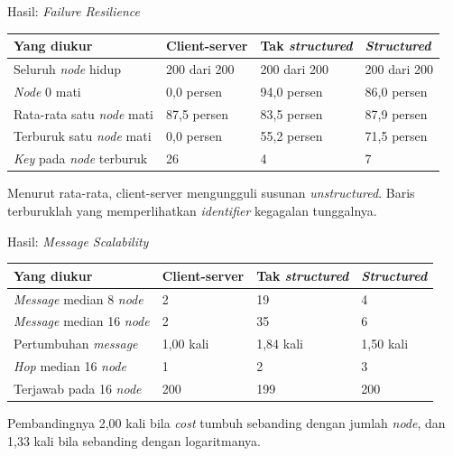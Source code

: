 \documentclass[aspectratio=169, table, 12pt]{beamer}
\begin{document}
\begin{frame}{{\Large Hasil: \textit{Failure Resilience}}}
  \vspace{6pt}
  \centering
  \small
  \begin{tabularx}{0.95\textwidth}{|X|l|l|l|}
    \hline
    \textbf{Yang diukur} & \textbf{Client-server} & \textbf{Tak \textit{structured}} & \textbf{\textit{Structured}} \\
    \hline
    Seluruh \textit{node} hidup & 200 dari 200 & 200 dari 200 & 200 dari 200 \\
    \hline
    \textit{Node} 0 mati & 0,0 persen & 94,0 persen & 86,0 persen \\
    \hline
    Rata-rata satu \textit{node} mati & 87,5 persen & 83,5 persen & 87,9 persen \\
    \hline
    Terburuk satu \textit{node} mati & 0,0 persen & 55,2 persen & 71,5 persen \\
    \hline
    \textit{Key} pada \textit{node} terburuk & 26 & 4 & 7 \\
    \hline
  \end{tabularx}

  \vspace{6pt}
  {\small Menurut rata-rata, client-server mengungguli susunan \textit{unstructured}.
  Baris terburuklah yang memperlihatkan \textit{identifier} kegagalan tunggalnya.}
\end{frame}

\begin{frame}{{\Large Hasil: \textit{Message Scalability}}}
  \vspace{6pt}
  \centering
  \small
  \begin{tabularx}{0.95\textwidth}{|X|l|l|l|}
    \hline
    \textbf{Yang diukur} & \textbf{Client-server} & \textbf{Tak \textit{structured}} & \textbf{\textit{Structured}} \\
    \hline
    \textit{Message} median 8 \textit{node} & 2 & 19 & 4 \\
    \hline
    \textit{Message} median 16 \textit{node} & 2 & 35 & 6 \\
    \hline
    Pertumbuhan \textit{message} & 1,00 kali & 1,84 kali & 1,50 kali \\
    \hline
    \textit{Hop} median 16 \textit{node} & 1 & 2 & 3 \\
    \hline
    Terjawab pada 16 \textit{node} & 200 & 199 & 200 \\
    \hline
  \end{tabularx}

  \vspace{6pt}
  {\small Pembandingnya 2,00 kali bila \textit{cost} tumbuh sebanding dengan jumlah
  \textit{node}, dan 1,33 kali bila sebanding dengan logaritmanya.}
\end{frame}
\end{document}

